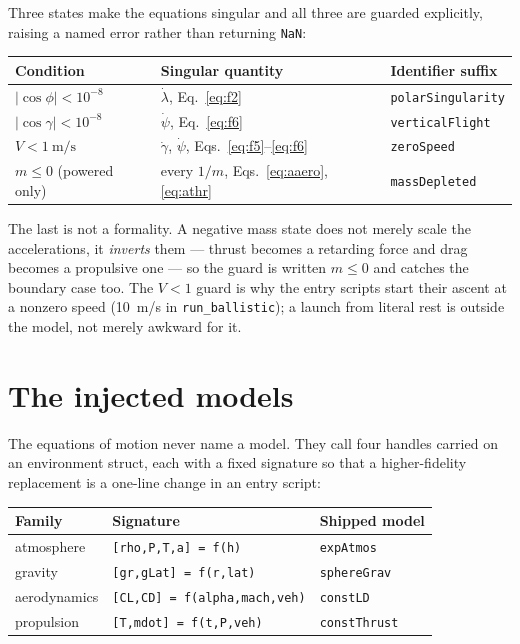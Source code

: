 \documentclass[11pt]{article}
\newcommand{\code}[1]{\texttt{#1}}
\begin{document}
Three states make the equations singular and all three are guarded explicitly,
raising a named error rather than returning \code{NaN}:

\begin{center}
\begin{tabular}{lll}
\toprule
Condition & Singular quantity & Identifier suffix \\
\midrule
$|\cos\phi| < 10^{-8}$   & $\dot\lambda$, Eq.~\eqref{eq:f2}            & \code{polarSingularity} \\
$|\cos\gamma| < 10^{-8}$ & $\dot\psi$, Eq.~\eqref{eq:f6}               & \code{verticalFlight} \\
$V < 1~\mathrm{m/s}$     & $\dot\gamma$, $\dot\psi$, Eqs.~\eqref{eq:f5}--\eqref{eq:f6} & \code{zeroSpeed} \\
$m \le 0$ (powered only) & every $1/m$, Eqs.~\eqref{eq:aaero}, \eqref{eq:athr} & \code{massDepleted} \\
\bottomrule
\end{tabular}
\end{center}

The last is not a formality. A negative mass state does not merely scale the
accelerations, it \emph{inverts} them --- thrust becomes a retarding force and
drag becomes a propulsive one --- so the guard is written $m\le 0$ and catches
the boundary case too. The $V<1$ guard is why the entry scripts start their
ascent at a nonzero speed (10~m/s in \code{run\_ballistic}); a launch from
literal rest is outside the model, not merely awkward for it.

\section{The injected models}
\label{sec:models}

The equations of motion never name a model. They call four handles carried on
an environment struct, each with a fixed signature so that a higher-fidelity
replacement is a one-line change in an entry script:

\begin{center}
\begin{tabular}{lll}
\toprule
Family & Signature & Shipped model \\
\midrule
atmosphere   & \code{[rho,P,T,a] = f(h)}          & \code{expAtmos} \\
gravity      & \code{[gr,gLat]   = f(r,lat)}      & \code{sphereGrav} \\
aerodynamics & \code{[CL,CD]     = f(alpha,mach,veh)} & \code{constLD} \\
propulsion   & \code{[T,mdot]    = f(t,P,veh)}    & \code{constThrust} \\
\bottomrule
\end{tabular}
\end{center}
\end{document}
